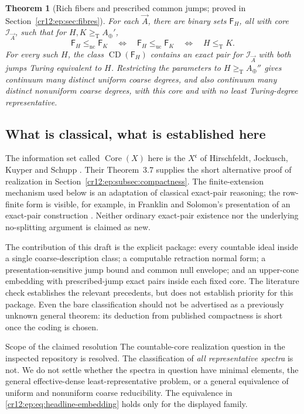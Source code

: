 \documentclass[11pt,letterpaper]{article}
\theoremstyle{plain}
\newtheorem{theorem}{Theorem}[section]
\theoremstyle{definition}
\theoremstyle{remark}
\numberwithin{equation}{section}
\newcommand{\leT}{\leq_{\mathrm T}}
\newcommand{\geT}{\geq_{\mathrm T}}
\newcommand{\leuc}{\leq_{\mathrm{uc}}}
\newcommand{\lenc}{\leq_{\mathrm{nc}}}
\newcommand{\Core}{\operatorname{Core}}
\newcommand{\CD}{\operatorname{CD}}
\newcommand{\I}{\mathcal I}
\newcommand{\Aplus}{A_{\oplus}}          %
\newcommand{\Fint}{\mathsf F}            %
\begin{document}
\begin{theorem}[Rich fibers and prescribed common jumps; proved in Section~\ref{cr12:ep:sec:fibres}]\label{cr12:ep:thm:headline-fibre}
For each $\vec A$, there are binary sets $\Fint_H$, all with core $\I_{\vec A}$, such
that for $H,K\geT \Aplus'$,
\begin{equation}\label{cr12:ep:eq:headline-embedding}
 \Fint_H\lenc \Fint_K\quad\Longleftrightarrow\quad
 \Fint_H\leuc \Fint_K\quad\Longleftrightarrow\quad H\leT K.
\end{equation}
For every such $H$, the class $\CD(\Fint_H)$ contains an exact pair for $\I_{\vec A}$
with both jumps Turing equivalent to $H$. Restricting the parameters to
$H\geT \Aplus''$ gives continuum many distinct uniform coarse degrees, and also
continuum many distinct nonuniform coarse degrees, with this core and with no least
Turing-degree representative.
\end{theorem}

\subsection{What is classical, what is established here}
The information set called $\Core(X)$ here is the $X^{\mathfrak c}$ of Hirschfeldt,
Jockusch, Kuyper and Schupp \cite[Definition~3.1]{HJKS}. Their Theorem~3.7 supplies
the short alternative proof of realization in
Section~\ref{cr12:ep:subsec:compactness}. The finite-extension mechanism used below is
an adaptation of classical exact-pair reasoning; the row-finite form is visible, for
example, in Franklin and Solomon's presentation of an exact-pair construction
\cite[Section~2]{FS}. Neither ordinary exact-pair existence nor the underlying
no-splitting argument is claimed as new.

The contribution of this draft is the explicit package: every countable ideal inside
a single coarse-description class; a computable retraction normal form; a
presentation-sensitive jump bound and common null envelope; and an upper-cone
embedding with prescribed-jump exact pairs inside each fixed core. The literature
check establishes the relevant precedents, but does not establish priority for this
package. Even the bare classification should not be advertised as a previously
unknown general theorem: its deduction from published compactness is short once the
coding is chosen.

\begin{assessment}{Scope of the claimed resolution}
The countable-core realization question in the inspected repository is resolved.
The classification of \emph{all representative spectra} is not. We do not settle
whether the spectra in question have minimal elements, the general effective-dense
least-representative problem, or a general equivalence of uniform and nonuniform
coarse reducibility. The equivalence in \eqref{cr12:ep:eq:headline-embedding} holds
only for the displayed family.
\end{assessment}
\end{document}
